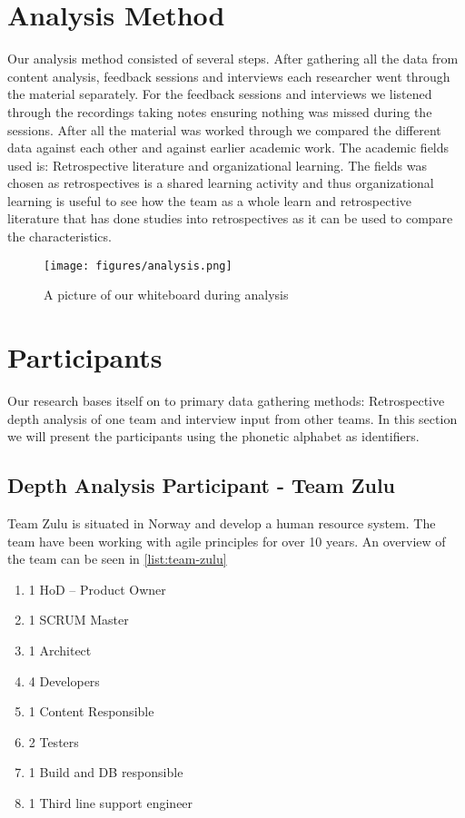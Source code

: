 \section{Analysis Method}
Our analysis method consisted of several steps. After gathering all the data from content analysis, feedback sessions and interviews each researcher went through the material separately. For the feedback sessions and interviews we listened through the recordings taking notes ensuring nothing was missed during the sessions. After all the material was worked through we compared the different data against each other and against earlier academic work. The academic fields used is: Retrospective literature and organizational learning. The fields was chosen as retrospectives is a shared learning activity and thus organizational learning is useful to see how the team as a whole learn and retrospective literature that has done studies into retrospectives as it can be used to compare the characteristics.

\begin{figure}
	\centering
	\texttt{[image: figures/analysis.png]}
	\caption{A picture of our whiteboard during analysis}
	\label{fig:Analysis-trends}
\end{figure}

\section{Participants}
Our research bases itself on to primary data gathering methods: Retrospective depth analysis of one team and interview input from other teams. In this section we will present the participants using the phonetic alphabet as identifiers. 

\subsection{Depth Analysis Participant - Team Zulu}
\label{section:team-zulu-description}
Team Zulu is situated in Norway and develop a human resource system. The team have been working with agile principles for over 10 years. An overview of the team can be seen in \autoref{list:team-zulu}

 \begin{enumerate}
 \label{list:team-zulu}
	\item 1 HoD – Product Owner 
	\item 1 SCRUM Master
	\item 1 Architect
	\item 4 Developers
	\item 1 Content Responsible
	\item 2 Testers
	\item 1 Build and DB responsible
	\item 1 Third line support engineer
\end{enumerate} 

